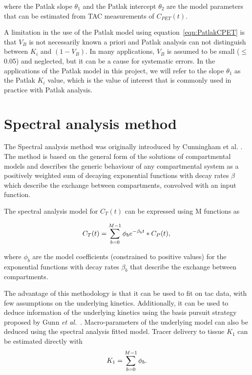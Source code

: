 where the Patlak slope $\theta_1$ and the Patlak intercept $\theta_2$ are the model parameters that can be estimated from TAC measurements of ${C_{PET}}(t)$. 

A limitation in the use of the Patlak model using equation~\ref{eqn:PatlakCPET} is that $V_B$ is not necessarily known a priori and Patlak analysis can not distinguish between $K_i$ and $(1-V_B)$. In many applications, $V_B$ is assumed to be small ($\leq$0.05) and neglected, but it can be a cause for systematic errors. 
In the applications of the Patlak model in this project, we will refer to the slope $\theta_1$ as the Patlak $K_i$ value, which is the value of interest that is commonly used in practice with Patlak analysis.


\section{Spectral analysis method}
The Spectral analysis method was originally introduced by Cunningham et al. \cite{Cunningham1993}. The method is based on the general form of the solutions of compartmental models and describes the generic behaviour of any compartmental system as a positively weighted sum of decaying exponential functions with decay rates $\beta$ which describe the exchange between compartments, convolved with an input function. 

The spectral analysis model for $C_T(t)$ can be expressed using M functions as

\begin{equation} 
\label{eqn:SpectralModel}
C_{T}(t)  =  \sum_{b=0}^{M-1} {\phi_b}  e^{-\beta_b t} \ast C_P(t)   \\ , \\
\end{equation}

where $\phi_b$ are the model coefficients (constrained to positive values) for the exponential functions with decay rates $\beta_b$ that describe the exchange between compartments. 

The advantage of this methodology is that it can be used to fit on \gls{tac} data, with few assumptions on the underlying kinetics. Additionally, it can be used to deduce information of the underlying kinetics using the basis pursuit strategy proposed by Gunn \textit{et al.}~\cite{Gunn2002}.
Macro-parameters of the underlying model can also be deduced using the spectral analysis fitted model. Tracer delivery to tissue $K_1$ can be estimated directly with
\begin{equation} 
\label{eqn:SpectralModel_K1}
K_1  =  \sum_{b=0}^{M-1} {\phi_b}   \\ . \\
\end{equation}

